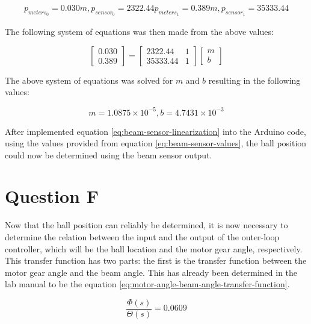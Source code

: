 \documentclass[11pt, letterpaper]{article}
\begin{document}
\[
    \begin{aligned}
        p_{meters_{0}} = 0.030m, p_{sensor_{0}} = 2322.44
        p_{meters_{1}} = 0.389m, p_{sensor_{1}} = 35333.44
    \end{aligned}
\]

The following system of equations was then made from the above values:

\begin{equation}
    \begin{bmatrix}
        0.030 \\
        0.389
    \end{bmatrix}
    =
    \begin{bmatrix}
        2322.44  & 1 \\
        35333.44 & 1
    \end{bmatrix}
    \begin{bmatrix}
        m \\
        b
    \end{bmatrix}
\end{equation}

The above system of equations was solved for $m$ and $b$ resulting in the following values:

\begin{equation}
    \label{eq:beam-sensor-values}
    m = 1.0875 \times 10^{-5}, b = 4.7431 \times 10^{-3}
\end{equation}

After implemented equation \ref{eq:beam-sensor-linearization} into the Arduino code,
using the values provided from
equation \ref{eq:beam-sensor-values}, the ball position could now be determined using
the beam sensor output.

\clearpage
\section{Question F}

Now that the ball position can reliably be determined, it is now necessary to determine
the relation between the input and the output of the outer-loop controller, which will be
the ball location and the motor gear angle, respectively. This transfer function has two parts:
the first is the transfer function between the motor gear angle and the beam angle. This has
already been determined in the lab manual to be the equation
\ref{eq:motor-angle-beam-angle-transfer-function}.

\begin{equation}
    \label{eq:motor-angle-beam-angle-transfer-function}
    \frac{\Phi (s)}{\Theta (s)} = 0.0609
\end{equation}
\end{document}
